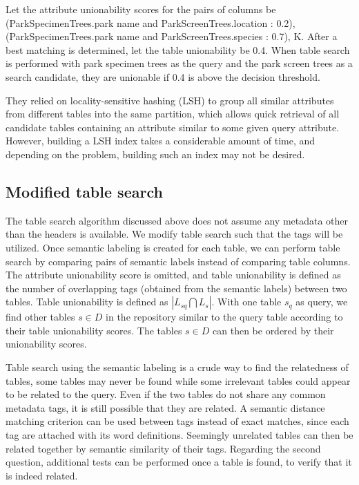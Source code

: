 Let the attribute unionability scores for the pairs of columns be {(ParkSpecimenTrees.park name and ParkScreenTrees.location : 0.2), (ParkSpecimenTrees.park name and ParkScreenTrees.species : 0.7), K}. After a best matching is determined, let the table unionability be 0.4. When table search is performed with park specimen trees as the query and the park screen trees as a search candidate, they are unionable if 0.4 is above the decision threshold.

They relied on locality-sensitive hashing (LSH) to group all similar attributes from different tables into the same partition, which allows quick retrieval of all candidate tables containing an attribute similar to some given query attribute. However, building a LSH index takes a considerable amount of time, and depending on the problem, building such an index may not be desired.

\subsection{Modified table search}
\label{ssec:ModifiedTableSearch}

The table search algorithm discussed above does not assume any metadata other than the headers is available. We modify table search such that the tags will be utilized. Once semantic labeling is created for each table, we can perform table search by comparing pairs of semantic labels instead of comparing table columns. The attribute unionability score is omitted, and table unionability is defined as the number of overlapping tags (obtained from the semantic labels) between two tables. Table unionability is defined as $|L_{sq}\bigcap L_{s}|$. With one table $s_{q}$ as query, we find other tables $s\in D$ in the repository similar to the query table according to their table unionability scores. The tables $s\in D$ can then be ordered by their unionability scores.

Table search using the semantic labeling is a crude way to find the relatedness of tables, some tables may never be found while some irrelevant tables could appear to be related to the query. Even if the two tables do not share any common metadata tags, it is still possible that they are related. A semantic distance matching criterion can be used between tags instead of exact matches, since each tag are attached with its word definitions. Seemingly unrelated tables can then be related together by semantic similarity of their tags. Regarding the second question, additional tests can be performed once a table is found, to verify that it is indeed related.

